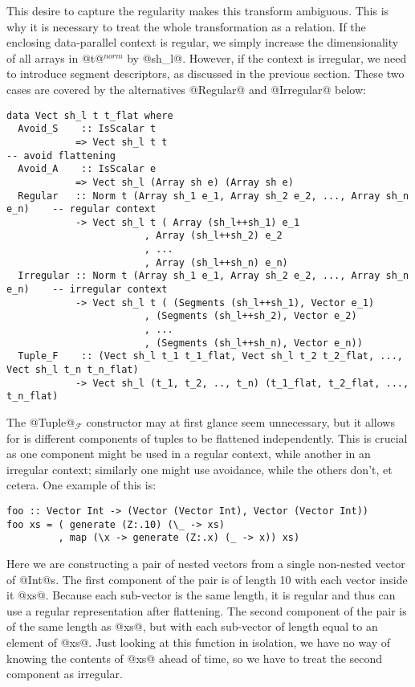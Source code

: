 This desire to capture the regularity makes this transform ambiguous. This is why it is necessary to treat the whole transformation as a relation. If the enclosing data-parallel context is regular, we simply increase the dimensionality of all arrays in @t@$^{\textit{norm}}$ by @sh_l@. However, if the context is irregular, we need to introduce segment descriptors, as discussed in the previous section. These two cases are covered by the alternatives @Regular@ and @Irregular@ below:
%
\begin{lstlisting}[style=ndp]
data Vect sh_l t t_flat where
  Avoid_S    :: IsScalar t
            => Vect sh_l t t                                              -- avoid flattening
  Avoid_A    :: IsScalar e
            => Vect sh_l (Array sh e) (Array sh e)
  Regular   :: Norm t (Array sh_1 e_1, Array sh_2 e_2, ..., Array sh_n e_n)    -- regular context
            -> Vect sh_l t ( Array (sh_l++sh_1) e_1
                        , Array (sh_l++sh_2) e_2
                        , ...
                        , Array (sh_l++sh_n) e_n)
  Irregular :: Norm t (Array sh_1 e_1, Array sh_2 e_2, ..., Array sh_n e_n)    -- irregular context
            -> Vect sh_l t ( (Segments (sh_l++sh_1), Vector e_1)
                        , (Segments (sh_l++sh_2), Vector e_2)
                        , ...
                        , (Segments (sh_l++sh_n), Vector e_n))
  Tuple_F    :: (Vect sh_l t_1 t_1_flat, Vect sh_l t_2 t_2_flat, ..., Vect sh_l t_n t_n_flat)
            -> Vect sh_l (t_1, t_2, .., t_n) (t_1_flat, t_2_flat, ..., t_n_flat)
\end{lstlisting}
%
The @Tuple@$_\mathcal{F}$ constructor may at first glance seem unnecessary, but it allows for is different components of tuples to be flattened independently. This is crucial as one component might be used in a regular context, while another in an irregular context; similarly one might use avoidance, while the others don't, et cetera. One example of this is:
%
\begin{lstlisting}[style=ndp]
foo :: Vector Int -> (Vector (Vector Int), Vector (Vector Int))
foo xs = ( generate (Z:.10) (\_ -> xs)
         , map (\x -> generate (Z:.x) (_ -> x)) xs)
\end{lstlisting}
%
Here we are constructing a pair of nested vectors from a single non-nested vector of @Int@s. The first component of the pair is of length 10 with each vector inside it @xs@. Because each sub-vector is the same length, it is regular and thus can use a regular representation after flattening. The second component of the pair is of the same length as @xs@, but with each sub-vector of length equal to an element of @xs@. Just looking at this function in isolation, we have no way of knowing the contents of @xs@ ahead of time, so we have to treat the second component as irregular.

